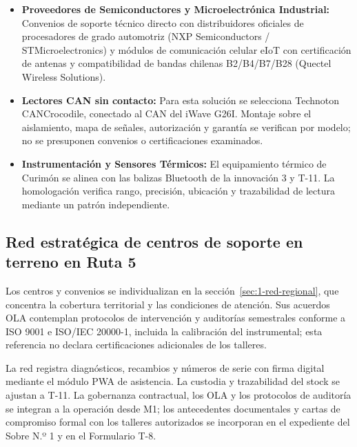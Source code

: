 \begin{itemize}
  \item \textbf{Proveedores de Semiconductores y Microelectrónica Industrial:} Convenios de soporte técnico directo con distribuidores oficiales de procesadores de grado automotriz (NXP Semiconductors / STMicroelectronics) y módulos de comunicación celular eIoT con certificación de antenas y compatibilidad de bandas chilenas B2/B4/B7/B28 (Quectel Wireless Solutions).
  \item \textbf{Lectores CAN sin contacto:} Para esta solución se selecciona Technoton CANCrocodile, conectado al CAN del iWave G26I. Montaje sobre el aislamiento, mapa de señales, autorización y garantía se verifican por modelo; no se presuponen convenios o certificaciones examinados.
  \item \textbf{Instrumentación y Sensores Térmicos:} El equipamiento térmico de Curimón se alinea con las balizas Bluetooth de la innovación 3 y T-11. La homologación verifica rango, precisión, ubicación y trazabilidad de lectura mediante un patrón independiente.
\end{itemize}

\subsection{Red estratégica de centros de soporte en terreno en Ruta 5}\label{sec:1-alianza-red}

Los centros y convenios se individualizan en la sección~\ref{sec:1-red-regional}, que concentra la cobertura territorial y las condiciones de atención. Sus acuerdos OLA contemplan protocolos de intervención y auditorías semestrales conforme a ISO 9001 e ISO/IEC 20000-1, incluida la calibración del instrumental; esta referencia no declara certificaciones adicionales de los talleres.

La red registra diagnósticos, recambios y números de serie con firma digital mediante el módulo PWA de asistencia. La custodia y trazabilidad del stock se ajustan a T-11. La gobernanza contractual, los OLA y los protocolos de auditoría se integran a la operación desde M1; los antecedentes documentales y cartas de compromiso formal con los talleres autorizados se incorporan en el expediente del Sobre N.º 1 y en el Formulario T-8.

\nocite{cisbenchmarks2024, ley19799, ley21377, ley21663, ley21719, iso9001, iso12207, iso20000_1, iso22301, iso27001, ds43minsal, ds298, codigo_trabajo_25bis, nist_sp800_207, nist_csf2, owasp_asvs4}
